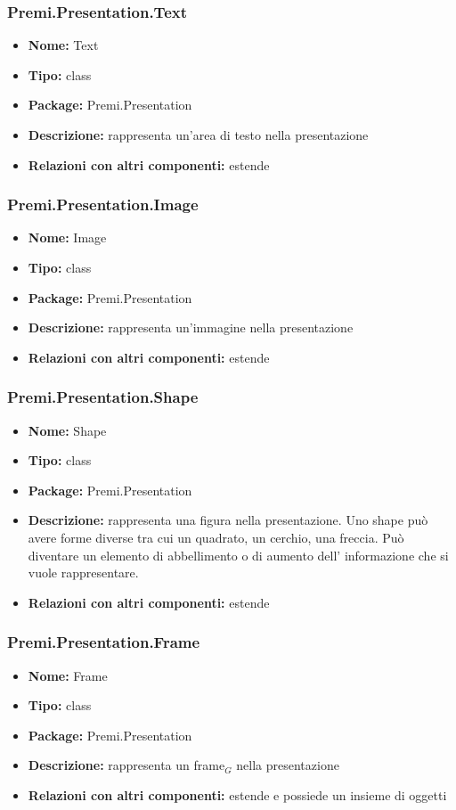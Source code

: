 \subsubsection{Premi.Presentation.Text}
\begin{itemize}
  \item \textbf{Nome:} Text
  \item \textbf{Tipo:} class
  \item \textbf{Package:} Premi.Presentation
  \item \textbf{Descrizione:} rappresenta un'area di testo nella presentazione
    \item \textbf{Relazioni con altri componenti:} estende 
\end{itemize}
\subsubsection{Premi.Presentation.Image}
\begin{itemize}
  \item \textbf{Nome:} Image
  \item \textbf{Tipo:} class
  \item \textbf{Package:} Premi.Presentation
  \item \textbf{Descrizione:} rappresenta un'immagine nella presentazione
      \item \textbf{Relazioni con altri componenti:} estende 
\end{itemize}
\subsubsection{Premi.Presentation.Shape}
\begin{itemize}
  \item \textbf{Nome:} Shape
  \item \textbf{Tipo:} class
  \item \textbf{Package:} Premi.Presentation
  \item \textbf{Descrizione:} rappresenta una figura nella presentazione. Uno shape può avere forme diverse tra cui un quadrato, un cerchio, una freccia. Può diventare un elemento di abbellimento o di aumento dell' informazione che si vuole rappresentare. 
      \item \textbf{Relazioni con altri componenti:} estende 
\end{itemize}
\subsubsection{Premi.Presentation.Frame}
\begin{itemize}
  \item \textbf{Nome:} Frame
  \item \textbf{Tipo:} class
  \item \textbf{Package:} Premi.Presentation
  \item \textbf{Descrizione:} rappresenta un frame$_G$ nella presentazione
  \item \textbf{Relazioni con altri componenti:} estende  e possiede un insieme di oggetti 
\end{itemize}
